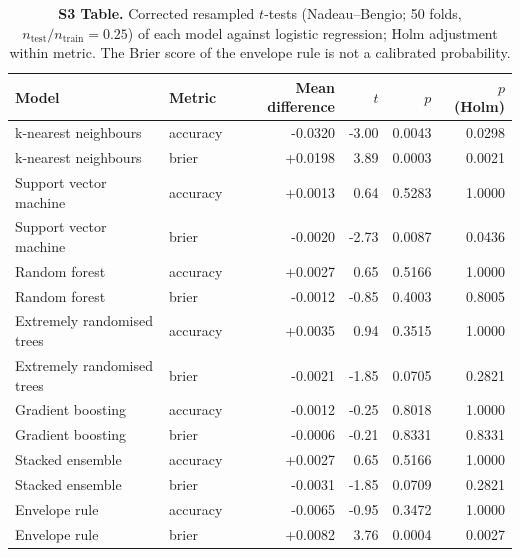 \begin{table}[!ht]\centering\small
\caption{{\bf S3 Table.} Corrected resampled $t$-tests (Nadeau--Bengio; 50 folds, $n_\mathrm{test}/n_\mathrm{train}=0.25$) of each model against logistic regression; Holm adjustment within metric. The Brier score of the envelope rule is not a calibrated probability.}
\begin{tabular}{llrrrr}\toprule
Model & Metric & Mean difference & $t$ & $p$ & $p$ (Holm)\\\midrule
k-nearest neighbours & accuracy & -0.0320 & -3.00 & 0.0043 & 0.0298\\
k-nearest neighbours & brier & +0.0198 & 3.89 & 0.0003 & 0.0021\\
Support vector machine & accuracy & +0.0013 & 0.64 & 0.5283 & 1.0000\\
Support vector machine & brier & -0.0020 & -2.73 & 0.0087 & 0.0436\\
Random forest & accuracy & +0.0027 & 0.65 & 0.5166 & 1.0000\\
Random forest & brier & -0.0012 & -0.85 & 0.4003 & 0.8005\\
Extremely randomised trees & accuracy & +0.0035 & 0.94 & 0.3515 & 1.0000\\
Extremely randomised trees & brier & -0.0021 & -1.85 & 0.0705 & 0.2821\\
Gradient boosting & accuracy & -0.0012 & -0.25 & 0.8018 & 1.0000\\
Gradient boosting & brier & -0.0006 & -0.21 & 0.8331 & 0.8331\\
Stacked ensemble & accuracy & +0.0027 & 0.65 & 0.5166 & 1.0000\\
Stacked ensemble & brier & -0.0031 & -1.85 & 0.0709 & 0.2821\\
Envelope rule & accuracy & -0.0065 & -0.95 & 0.3472 & 1.0000\\
Envelope rule & brier & +0.0082 & 3.76 & 0.0004 & 0.0027\\
\bottomrule\end{tabular}\end{table}

